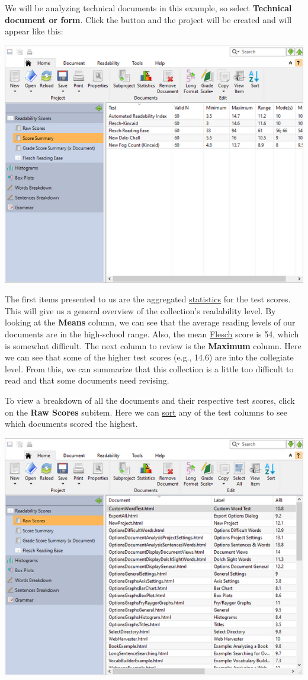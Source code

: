 \documentclass[
]{book}
\theoremstyle{definition}
\theoremstyle{definition}
\theoremstyle{definition}
\theoremstyle{definition}
\theoremstyle{remark}
\begin{document}
We will be analyzing technical documents in this example, so select \textbf{Technical document or form}. Click the  button and the project will be created and will appear like this:

\includegraphics{Images/batchscorestats.png}

The first items presented to us are the aggregated \protect\hyperlink{reviewing-batch-scores}{statistics} for the test scores. This will give us a general overview of the collection's readability level. By looking at the \textbf{Means} column, we can see that the average reading levels of our documents are in the high-school range. Also, the mean \protect\hyperlink{flesch-test}{Flesch} score is 54, which is somewhat difficult. The next column to review is the \textbf{Maximum} column. Here we can see that some of the higher test scores (e.g., 14.6) are into the collegiate level. From this, we can summarize that this collection is a little too difficult to read and that some documents need revising.

To view a breakdown of all the documents and their respective test scores, click on the \textbf{Raw Scores} subitem. Here we can \protect\hyperlink{column-sorting}{sort} any of the test columns to see which documents scored the highest.

\includegraphics{Images/batchrawscores.png}
\end{document}
